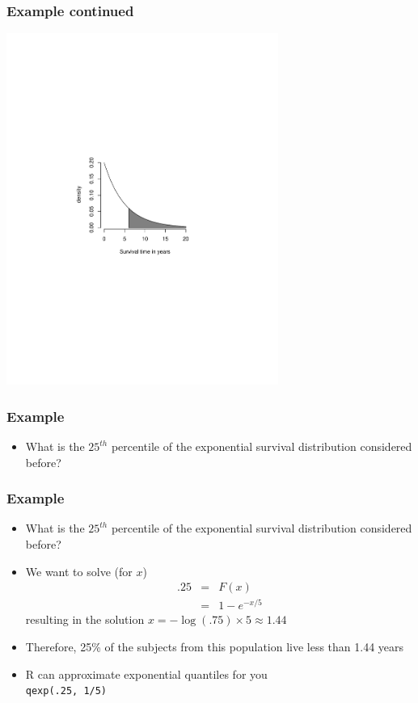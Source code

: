 \documentclass[aspectratio=169]{beamer}
\begin{document}
\begin{frame}
\frametitle{Example continued}
   \includegraphics[width=3.5in]{exponential.pdf}
\end{frame}


\begin{frame}
\frametitle{Example}
\begin{itemize}
\item  What is the $25^{th}$ percentile of the exponential survival distribution considered before?
\end{itemize}
\end{frame}

\begin{frame}
\frametitle{Example}
\begin{itemize}
\item  What is the $25^{th}$ percentile of the exponential survival distribution considered before?
\item We want to solve (for $x$)
\begin{eqnarray*}
.25 & = & F(x) \\  
    & = & 1 - e^{-x/5}
\end{eqnarray*}
resulting in the solution $x = -\log(.75) \times 5 \approx 1.44$
\item Therefore, 25\% of the
subjects from this population live less than 1.44 years
\item R can approximate exponential quantiles for you \\
\texttt{qexp(.25, 1/5)}
\end{itemize}
\end{frame}
\end{document}
